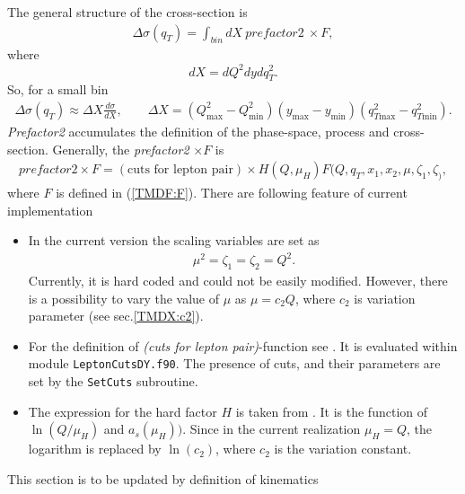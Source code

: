 \documentclass[prd,nofootinbib,eqsecnum,final]{revtex4}
\renewcommand{\(}{\left(}
\renewcommand{\)}{\right)}
\renewcommand{\[}{\left[}
\renewcommand{\]}{\right]}
\newcommand{\red}[1]{{\color[rgb]{1,0,0} #1}}
\begin{document}
The general structure of the cross-section is
\begin{eqnarray}
\Delta\sigma(q_T)=\int_{bin} dX ~prefactor2~\times F,
\end{eqnarray}
where $$dX=dQ^2 dy d q^2_T.$$ So, for a small bin
\begin{eqnarray}
\Delta\sigma(q_T)\approx\Delta X \frac{d\sigma}{dX},\qquad \Delta X=(Q_{\text{max}}^2-Q_{\text{min}}^2)(y_{\text{max}}-y_{\text{min}})(q_{T\text{max}}^2-q_{T\text{min}}^2).
\end{eqnarray}
\textit{Prefactor2} accumulates the definition of the phase-space, process and cross-section. Generally, the \textit{prefactor2} $\times F$ is
\begin{eqnarray}
prefactor2 \times F=(\text{cuts for lepton pair})\times H(Q,\mu_H)F(Q,q_T,x_1,x_2,\mu,\zeta_1,\zeta_),
\end{eqnarray}
where $F$ is defined in (\ref{TMDF:F}). There are following feature of current implementation
\begin{itemize}
\item In the current version the scaling variables are set as
\begin{eqnarray}
\mu^2=\zeta_1=\zeta_2=Q^2.
\end{eqnarray}
Currently, it is hard coded and could not be easily modified. However, there is a possibility to vary the value of $\mu$ as $\mu=c_2 Q$, where $c_2$ is variation parameter (see sec.\ref{TMDX:c2}).
\item For the definition of \textit{(cuts for lepton pair)}-function see \cite{Scimemi:2017etj}. It is evaluated within module \texttt{LeptonCutsDY.f90}. The presence of cuts, and their parameters are set by the \texttt{SetCuts} subroutine.
\item The expression for the hard factor $H$ is taken from \cite{Gehrmann:2010ue}. It is the function of $\ln(Q/\mu_H)$ and $a_s(\mu_H))$. Since in the current realization $\mu_H=Q$, the logarithm is replaced by $\ln(c_2)$, where $c_2$ is the variation constant.
\end{itemize}

\red{This section is to be updated by definition of kinematics }
\end{document}
